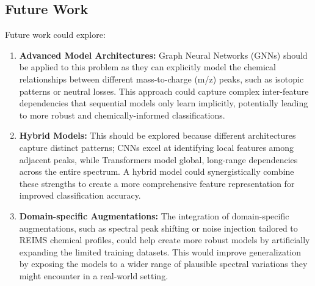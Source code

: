 \subsection{Future Work}

Future work could explore:

\begin{enumerate}
    \item \textbf{Advanced Model Architectures:} Graph Neural Networks (GNNs) \citep{Wu2020} should be applied to this problem as they can explicitly model the chemical relationships between different mass-to-charge (m/z) peaks, such as isotopic patterns or neutral losses. This approach could capture complex inter-feature dependencies that sequential models only learn implicitly, potentially leading to more robust and chemically-informed classifications.
    
    \item \textbf{Hybrid Models:} This should be explored because different architectures capture distinct patterns; CNNs excel at identifying local features among adjacent peaks, while Transformers model global, long-range dependencies across the entire spectrum. A hybrid model could synergistically combine these strengths to create a more comprehensive feature representation for improved classification accuracy.
    
    \item \textbf{Domain-specific Augmentations:} The integration of domain-specific augmentations, such as spectral peak shifting or noise injection tailored to REIMS chemical profiles, could help create more robust models by artificially expanding the limited training datasets. This would improve generalization by exposing the models to a wider range of plausible spectral variations they might encounter in a real-world setting.
\end{enumerate}


